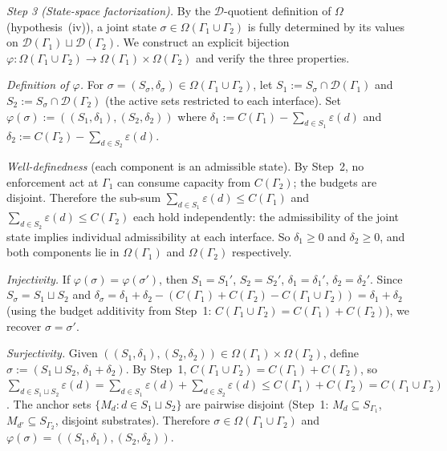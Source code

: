 \documentclass[11pt]{article}
\theoremstyle{remark}
\begin{document}
\begin{tcolorbox}[apfbox, title={Lemma $L_{\mathrm{loc}}$ (Locality)}]
\textit{Step 3 (State-space factorization).}  By the $\mathcal{D}$-quotient definition of $\Omega$ (hypothesis~(iv)), a joint state $\sigma \in \Omega(\Gamma_1 \cup \Gamma_2)$ is fully determined by its values on $\mathcal{D}(\Gamma_1) \sqcup \mathcal{D}(\Gamma_2)$.  We construct an explicit bijection $\varphi: \Omega(\Gamma_1 \cup \Gamma_2) \to \Omega(\Gamma_1) \times \Omega(\Gamma_2)$ and verify the three properties.

\textit{Definition of $\varphi$.}  For $\sigma = (S_\sigma, \delta_\sigma) \in \Omega(\Gamma_1 \cup \Gamma_2)$, let $S_1 := S_\sigma \cap \mathcal{D}(\Gamma_1)$ and $S_2 := S_\sigma \cap \mathcal{D}(\Gamma_2)$ (the active sets restricted to each interface).  Set $\varphi(\sigma) := ((S_1, \delta_1), (S_2, \delta_2))$ where $\delta_1 := C(\Gamma_1) - \sum_{d \in S_1} \varepsilon(d)$ and $\delta_2 := C(\Gamma_2) - \sum_{d \in S_2} \varepsilon(d)$.

\textit{Well-definedness} (each component is an admissible state).  By Step~2, no enforcement act at $\Gamma_1$ can consume capacity from $C(\Gamma_2)$; the budgets are disjoint.  Therefore the sub-sum $\sum_{d \in S_1} \varepsilon(d) \le C(\Gamma_1)$ and $\sum_{d \in S_2} \varepsilon(d) \le C(\Gamma_2)$ each hold independently: the admissibility of the joint state implies individual admissibility at each interface.  So $\delta_1 \ge 0$ and $\delta_2 \ge 0$, and both components lie in $\Omega(\Gamma_1)$ and $\Omega(\Gamma_2)$ respectively.

\textit{Injectivity.}  If $\varphi(\sigma) = \varphi(\sigma')$, then $S_1 = S_1'$, $S_2 = S_2'$, $\delta_1 = \delta_1'$, $\delta_2 = \delta_2'$.  Since $S_\sigma = S_1 \sqcup S_2$ and $\delta_\sigma = \delta_1 + \delta_2 - (C(\Gamma_1) + C(\Gamma_2) - C(\Gamma_1 \cup \Gamma_2)) = \delta_1 + \delta_2$ (using the budget additivity from Step~1: $C(\Gamma_1 \cup \Gamma_2) = C(\Gamma_1) + C(\Gamma_2)$), we recover $\sigma = \sigma'$.

\textit{Surjectivity.}  Given $(( S_1, \delta_1), (S_2, \delta_2)) \in \Omega(\Gamma_1) \times \Omega(\Gamma_2)$, define $\sigma := (S_1 \sqcup S_2,\, \delta_1 + \delta_2)$.  By Step~1, $C(\Gamma_1 \cup \Gamma_2) = C(\Gamma_1) + C(\Gamma_2)$, so $\sum_{d \in S_1 \sqcup S_2} \varepsilon(d) = \sum_{d \in S_1}\varepsilon(d) + \sum_{d \in S_2}\varepsilon(d) \le C(\Gamma_1) + C(\Gamma_2) = C(\Gamma_1 \cup \Gamma_2)$.  The anchor sets $\{M_d : d \in S_1 \sqcup S_2\}$ are pairwise disjoint (Step~1: $M_d \subseteq S_{\Gamma_1}$, $M_{d'} \subseteq S_{\Gamma_2}$, disjoint substrates).  Therefore $\sigma \in \Omega(\Gamma_1 \cup \Gamma_2)$ and $\varphi(\sigma) = ((S_1, \delta_1),(S_2, \delta_2))$.


\end{tcolorbox}
\end{document}
